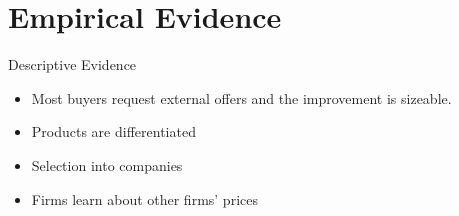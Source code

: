 \documentclass[10pt,aspectratio=169]{beamer}
\begin{document}

\section{Empirical Evidence}
 

\begin{frame}{Descriptive Evidence}\label{slide:Descriptive_evidence}
\begin{itemize}
    \item Most buyers request external offers and the improvement is sizeable. \hyperlink{slide:fig1}{} 
    \item Products are differentiated \hyperlink{slide:fig2}{} 
    \item Selection into companies \hyperlink{slide:fig3}{}
    \item Firms learn about other firms' prices  \hyperlink{slide:fig4}{} 
\end{itemize}
\end{frame}

\end{document}

